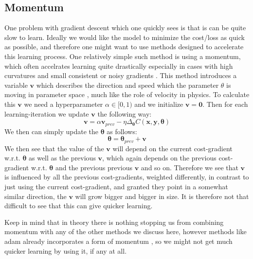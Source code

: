 \documentclass{article}
\begin{document}
\subsection{Momentum}
One problem with gradient descent which one quickly sees is that is can be quite
slow to learn. Ideally we would like the model to minimize the cost/loss as
quick as possible, and therefore one might want to use methods designed to
accelerate this learning process. One relatively simple such method is using a
momentum, which often accelrates learning quite drastically especially in cases
with high curvatures and small consistent or noisy gradients
\cite[s.~8.3.2]{goodfellow2016deep}. This method introduces a variable $\bm{v}$
which describes the direction and speed which the parameter $\theta$ is moving
in parameter space \cite[s.~8.3.2]{goodfellow2016deep}, much like the role of
velocity in physics. To calculate this $\bm{v}$ we need a hyperparameter $\alpha
    \in [0, 1)$ and we initialize $\bm{v} = \bm{0}$. Then for each
learning-iteration we update $\bm{v}$ the following way:
$$\bm{v} = \alpha \bm{v}_{prev} - \eta \Delta_{\bm{\theta}} C(\bm{x}, \bm{y}, \bm{\theta})$$
We then can simply update the $\bm{\theta}$ as follows:
$$\bm{\theta} = \bm{\theta}_{prev} + \bm{v}$$
We then see that the value of the $\bm{v}$ will depend on the current cost-gradient
w.r.t. $\bm{\theta}$ as well as the previous $\bm{v}$, which again depends on
the previous cost-gradient w.r.t. $\bm{\theta}$ and the previous previous
$\bm{v}$ and so on. Therefore we see that $\bm{v}$ is influenced by all the
previous cost-gradients, weighted differently, in contrast to just using the
current cost-gradient, and granted they point in a somewhat similar direction,
the $\bm{v}$ will grow bigger and bigger in size. It is therefore not that
difficult to see that this can give quicker learning.


Keep in mind that in theory there is nothing stopping us from combining momentum
with any of the other methods we discuss here, however methods like adam already
incorporates a form of momentum \cite[s.~8.5.3]{goodfellow2016deep}, so we might
not get much quicker learning by using it, if any at all.
\end{document}
